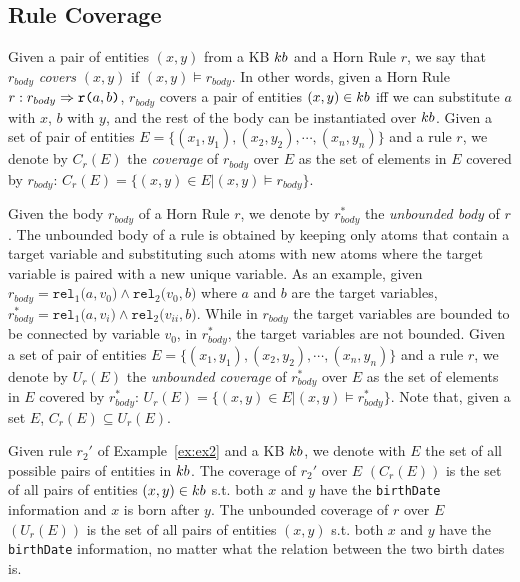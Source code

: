 \subsection{Rule Coverage}
Given a pair of entities $(x,y)$ from a KB ${\sc kb}$ and a Horn Rule $r$, we say that $r_{body}$ \emph{covers} $(x,y)$ if
$(x,y) \models r_{body}$. In other words, given a Horn Rule $r : r_{body} \Rightarrow \texttt{r(}a,b\texttt{)}$, $r_{body}$ covers a pair of entities $(x,y) \in {\sc kb}$ iff we can substitute $a$ with $x$, $b$ with $y$, and the rest of the body can be instantiated over ${\sc kb}$. Given a set of pair of entities $E = \{(x_1,y_1),(x_2,y_2),\cdots,(x_n,y_n)\}$ and a rule $r$, we denote by $C_r(E)$ the \emph{coverage} of $r_{body}$ over $E$ as the set of elements in $E$ covered by $r_{body}$: $C_r(E)=\{(x,y) \in E | (x,y) \models r_{body}\}$.

Given the body $r_{body}$ of a Horn Rule $r$, we denote by $r^{*}_{body}$ the \emph{unbounded body} of $r$. The unbounded body of a rule is obtained by keeping only atoms that contain a target variable and substituting such atoms with new atoms where the target variable is paired with a new unique variable. As an example, given $r_{body} = \texttt{rel}_1\texttt{(}a,v_0\texttt{)} \wedge \texttt{rel}_2\texttt{(}v_0,b\texttt{)}$ where $a$ and $b$ are the target variables, $r^{*}_{body} = \texttt{rel}_1\texttt{(}a,v_i\texttt{)} \wedge \texttt{rel}_2\texttt{(}v_{ii},b\texttt{)}$.
While in $r_{body}$ the target variables are bounded to be connected by variable $v_0$, in $r^{*}_{body}$, the target variables are not bounded.
Given a set of pair of entities $E = \{(x_1,y_1),(x_2,y_2),\cdots,(x_n,y_n)\}$ and a rule $r$, we denote by $U_r(E)$ the \emph{unbounded coverage} of $r^{*}_{body}$ over $E$ as the set of elements in $E$ covered by $r^{*}_{body}$: $U_r(E)=\{(x,y) \in E | (x,y) \models r^{*}_{body}\}$. Note that, given a set $E$, $C_r(E) \subseteq U_r(E)$. 

\begin{example}
	Given rule $r_2'$ of Example~\ref{ex:ex2} and a KB ${\sc kb}$, we denote with $E$ the set of all possible pairs of entities in ${\sc kb}$. The coverage of $r_2'$ over $E$ $(C_r(E))$ is the set of all pairs of entities $(x,y) \in {\sc kb}$ s.t. both $x$ and $y$ have the \texttt{birthDate} information and $x$ is born after $y$. The unbounded coverage of $r$ over $E$ $(U_r(E))$ is the set of all pairs of entities $(x,y)$ s.t. both $x$ and $y$ have the \texttt{birthDate} information, no matter what the relation between the two birth dates is. 
\end{example} 

